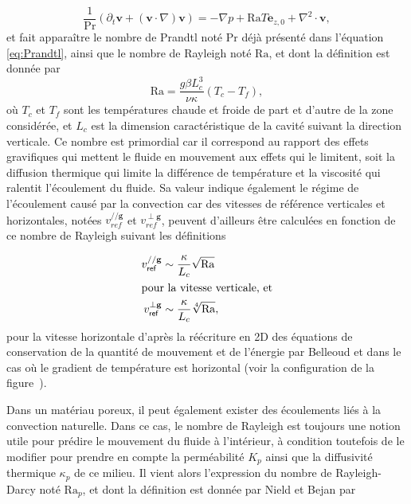\begin{equation}
	\frac{1}{\mathrm{Pr}}(\partial_t \mathbf{v} + (\mathbf{v} \cdot \nabla)\mathbf{v}) = -\nabla p + \mathrm{Ra} T \mathbf e_{z,0} + \nabla^2 \cdot \mathbf{v},
	\label{eq:NonDim_NavierStokes_Boussinesq_QtMvt}
\end{equation}
et fait apparaître le nombre de Prandtl noté $\mathrm{Pr}$ déjà présenté dans l'équation \eqref{eq:Prandtl}, ainsi que le nombre de Rayleigh noté $\mathrm{Ra}$, et dont la définition est donnée par 
\begin{equation}
	\mathrm{Ra} = \frac{g \beta L_c^3}{\nu \kappa} (T_c-T_f),
	\label{eq:NbrRayleigh}
\end{equation}
où $T_c$ et $T_f$ sont les températures chaude et froide de part et d'autre de la zone considérée, et $L_c$ est la dimension caractéristique de la cavité suivant la direction verticale. Ce nombre est primordial car il correspond au rapport des effets gravifiques qui mettent le fluide en mouvement aux effets qui le limitent, soit la diffusion thermique qui limite la différence de température et la viscosité qui ralentit l'écoulement du fluide. Sa valeur indique également le régime de l'écoulement causé par la convection car des vitesses de référence verticales et horizontales, notées $v_{ref}^{// \mathbf g}$ et $v_{ref}^{\perp \mathbf g}$, peuvent d'ailleurs être calculées en fonction de ce nombre de Rayleigh suivant les définitions

\begin{subequations}
	\begin{align}
		v_{\sf ref}^{// \mathbf g} &\sim \frac{\kappa}{L_c}\sqrt{\mathrm{Ra}} \label{eq:VitesseReferenceV_Rayleigh}\\
		\intertext{pour la vitesse verticale, et}
		v_{\sf ref}^{\perp \mathbf g} &\sim \frac{\kappa}{L_c}\sqrt[4]{\mathrm{Ra}},	\label{eq:VitesseReferenceH_Rayleigh}
	\end{align}
	\label{eq:VitesseReference_Rayleigh}%
\end{subequations}
pour la vitesse horizontale d'après la réécriture en 2D des équations de conservation de la quantité de mouvement et de l'énergie par Belleoud \cite{belleoud_etude_2016} et dans le cas où le gradient de température est horizontal (voir la configuration de la figure~).\medskip

Dans un matériau poreux, il peut également exister des écoulements liés à la convection naturelle. Dans ce cas, le nombre de Rayleigh est toujours une notion utile pour prédire le mouvement du fluide à l'intérieur, à condition toutefois de le modifier pour prendre en compte la perméabilité $K_p$ ainsi que la diffusivité thermique $\kappa_p$ de ce milieu. Il vient alors l'expression du nombre de Rayleigh-Darcy noté $\mathrm{Ra}_p$, et dont la définition est donnée par Nield et Bejan \cite{nield_convection_2013} par


